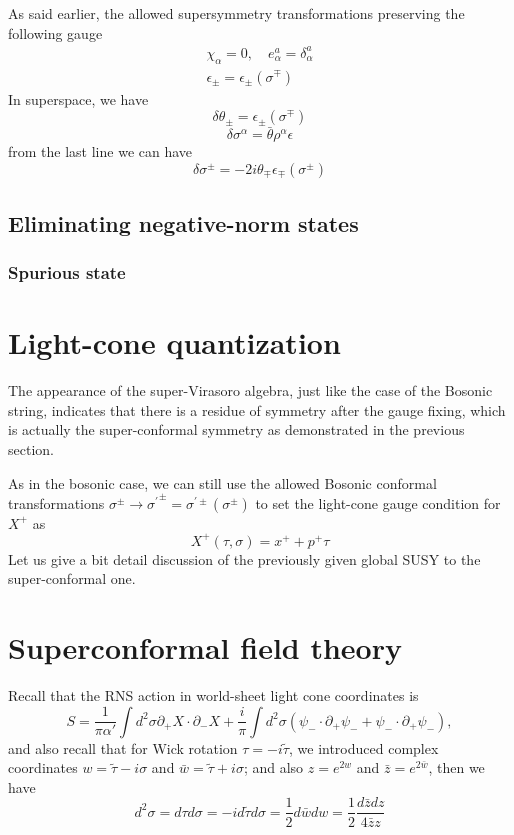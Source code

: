 \documentclass[graybox,envcountchap,sectrefs]{svmono}
\begin{document}
As said earlier, the allowed supersymmetry transformations preserving the following gauge
\begin{equation}
\begin{array}{c}
\chi_{\alpha}=0, \quad e_{\alpha}^{a}=\delta_{\alpha}^{a} \\
\epsilon_{\pm}=\epsilon_{\pm}\left(\sigma^{\mp}\right)
\end{array}
\end{equation}
In superspace, we have
\[
\delta \theta_{\pm}=\epsilon_{\pm}\left(\sigma^{\mp}\right)
\]
\[
\delta \sigma^{\alpha}=\bar{\theta} \rho^{\alpha} \epsilon
\]
from the last line we can have
\[
\delta \sigma^{\pm}=-2 i \theta_{\mp} \epsilon_{\mp}\left(\sigma^{\pm}\right)
\]

\subsection{Eliminating negative-norm states}
\subsubsection*{Spurious state}
 


\section{Light-cone quantization}
The appearance of the super-Virasoro algebra, just like the case of the Bosonic string, indicates that there is a residue of symmetry after the gauge fixing, which is actually the super-conformal symmetry as demonstrated in the previous section.

As in the bosonic case, we can still use the allowed Bosonic conformal transformations $\sigma^{\pm} \rightarrow {\sigma^{\prime}}^{\pm}=\sigma^{\prime \pm}\left(\sigma^{\pm}\right)$ to set the
light-cone gauge condition for $X^{+}$ as
\[
X^{+}(\tau, \sigma)=x^{+}+p^{+} \tau
\]
Let us give a bit detail discussion of the previously given global SUSY to the super-conformal one.

\section{Superconformal field theory}

Recall that the RNS action in world-sheet light cone coordinates is
\begin{equation}
S=\frac{1}{\pi \alpha'}	\int d^2\sigma \partial_{+}X\cdot \partial_{-}X+\frac{i}{\pi}\int d^2\sigma (\psi_{-}\cdot \partial_{+}\psi_{-}+\psi_{-}\cdot \partial_{+}\psi_{-}),
\end{equation}
and also recall that for Wick rotation $\tau=-i\tilde{\tau}$, we introduced complex coordinates $w=\tilde{\tau}-i\sigma$ and $\bar{w}=\tilde{\tau}+i\sigma$; and also $z=e^{2w}$ and $\bar{z}=e^{2\bar{w}}$, then we have
\begin{equation}
d^2\sigma =d\tau d\sigma=-id\tilde{\tau}d\sigma=	 \frac{1}{2}d\bar{w}dw=\frac{1}{2}\frac{d\bar{z}dz}{4\bar{z}z}
\end{equation}
\end{document}
